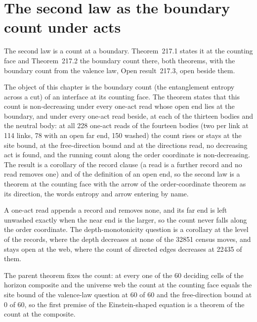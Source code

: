 \section{The second law as the boundary count under acts}\label{mod:XI-1-second-law-as-the-boundary-count-under-acts}
\label{narr:open:11-1}The second law is a count at a boundary. Theorem~217.1 states it at the counting face and Theorem~217.2 the boundary count there, both theorems, with the boundary count from the valence law, Open result~217.3, open beside them.
\begin{chtheorem}\label{box:XI-1-second-law-as-the-boundary-count-under-acts:1}
The object of this chapter is the boundary count (the entanglement entropy across a cut) of an interface at its counting face. The theorem states that this count is non-decreasing under every one-act read whose open end lies at the boundary, and under every one-act read beside, at each of the thirteen bodies and the neutral body: at all 228 one-act reads of the fourteen bodies (two per link at 114 links, 78 with an open far end, 150 washed) the count rises or stays at the site bound, at the free-direction bound and at the directions read, no decreasing act is found, and the running count along the order coordinate is non-decreasing. The result is a corollary of the record clause (a read is a further record and no read removes one) and of the definition of an open end, so the second law is a theorem at the counting face with the arrow of the order-coordinate theorem as its direction, the words entropy and arrow entering by name.
\end{chtheorem}
A one-act read appends a record and removes none, and its far end is left unwashed exactly when the near end is the larger, so the count never falls along the order coordinate. The depth-monotonicity question is a corollary at the level of the records, where the depth decreases at none of the 32851 census moves, and stays open at the web, where the count of directed edges decreases at 22435 of them.
\begin{chtheorem}\label{box:XI-1-second-law-as-the-boundary-count-under-acts:2}
The parent theorem fixes the count: at every one of the 60 deciding cells of the horizon composite and the universe web the count at the counting face equals the site bound of the valence-law question at 60 of 60 and the free-direction bound at 0 of 60, so the first premise of the Einstein-shaped equation is a theorem of the count at the composite.
\end{chtheorem}

